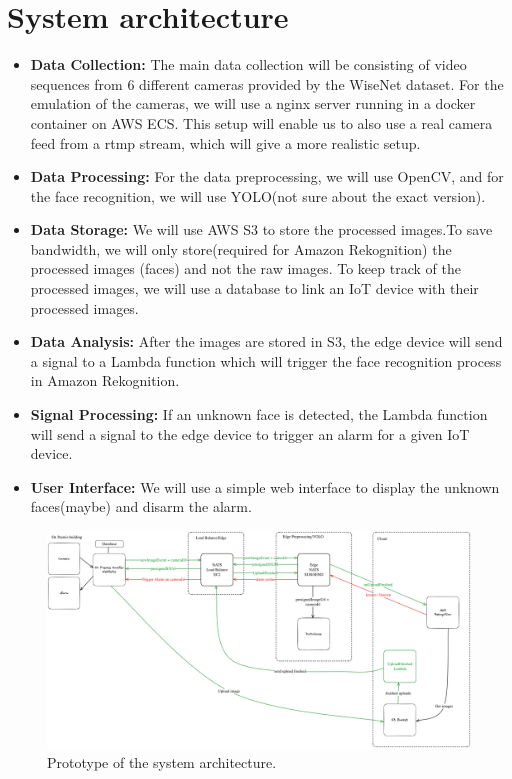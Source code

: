 \documentclass[conference]{IEEEtran}
\begin{document}
\section{System architecture}
\begin{itemize}
    \item \textbf{Data Collection:} The main data collection will be consisting of video sequences from 6 different cameras provided by the WiseNet dataset. 
                                    For the emulation of the cameras, we will use a nginx server running in a docker container on AWS ECS. This setup will
                                    enable us to also use a real camera feed from a rtmp stream, which will give a more realistic setup.
    \item \textbf{Data Processing:} For the data preprocessing, we will use OpenCV, and for the face recognition, we will use YOLO(not sure about the exact version).
    \item \textbf{Data Storage:} We will use AWS S3 to store the processed images.To save bandwidth, we will only store(required for Amazon Rekognition) the processed images (faces) 
                                    and not the raw images. To keep track of the processed images, we will use a database to link an IoT device with their processed images.
    \item \textbf{Data Analysis:} After the images are stored in S3, the edge device will send a signal to a Lambda function which will trigger the face recognition 
                                    process in Amazon Rekognition.
    \item \textbf{Signal Processing:} If an unknown face is detected, the Lambda function will send a signal to the edge device to trigger an alarm for a given IoT device.
    \item \textbf{User Interface:} We will use a simple web interface to display the unknown faces(maybe) and disarm the alarm.
\end{itemize}

\begin{figure}[h!]
    \centering
    \includegraphics[width=1\linewidth]{images/architecturev2.excalidraw.png}
    \caption{Prototype of the system architecture.}
    \label{fig:enter-label}
\end{figure}
\end{document}
